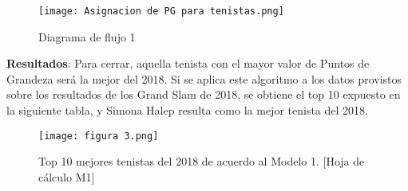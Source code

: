 \documentclass[a4paper]{article}
\begin{document}
 \begin{figure}[H]
    \begin{center}
    \texttt{[image: Asignacion de PG para tenistas.png]}    
    \end{center}    
    \caption{Diagrama de flujo 1}
\end{figure}
 
\textbf{Resultados}: Para cerrar, aquella tenista con el mayor valor de Puntos de Grandeza será la mejor del 2018. \newline
Si se aplica este algoritmo a los datos provistos sobre los resultados de los Grand Slam de 2018, se obtiene el top 10 expuesto en la siguiente tabla, y Simona Halep resulta como la mejor tenista del 2018.\newline

\begin{figure}[H]
    \begin{center}
    \texttt{[image: figura 3.png]}    
    \end{center}    
    \caption{Top 10 mejores tenistas del 2018 de acuerdo al Modelo 1. [Hoja de cálculo M1]}
\end{figure}
\end{document}
